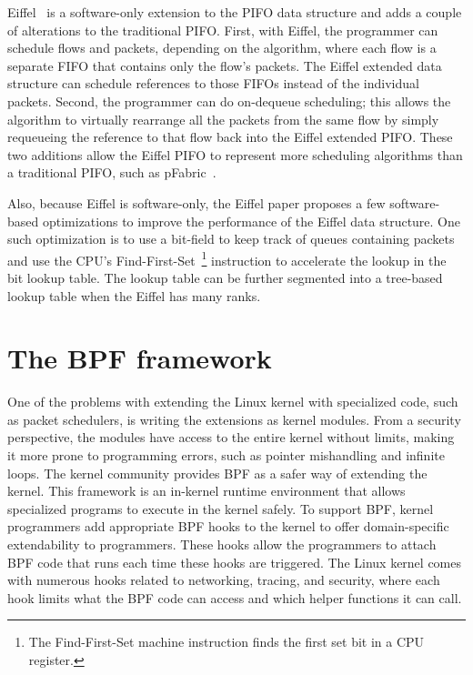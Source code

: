 \documentclass[sigconf, nonacm]{acmart}
\begin{document}
Eiffel~\cite{Saeed2019} is a software-only extension to the PIFO data structure and adds a couple of alterations to the traditional PIFO. First, with Eiffel, the programmer can schedule flows and packets, depending on the algorithm, where each flow is a separate FIFO that contains only the flow's packets. The Eiffel extended data structure can schedule references to those FIFOs instead of the individual packets. Second, the programmer can do on-dequeue scheduling; this allows the algorithm to virtually rearrange all the packets from the same flow by simply requeueing the reference to that flow back into the Eiffel extended PIFO. These two additions allow the Eiffel PIFO to represent more scheduling algorithms than a traditional PIFO, such as pFabric~\cite{alizadeh2013pfabric}.

Also, because Eiffel is software-only, the Eiffel paper proposes a few software-based optimizations to improve the performance of the Eiffel data structure. One such optimization is to use a bit-field to keep track of queues containing packets and use the CPU's Find-First-Set~\footnote{The Find-First-Set machine instruction finds the first set bit in a CPU register.} instruction to accelerate the lookup in the bit lookup table. The lookup table can be further segmented into a tree-based lookup table when the Eiffel has many ranks.


\section{The BPF framework}

One of the problems with extending the Linux kernel with specialized code, such as packet schedulers, is writing the extensions as kernel modules. From a security perspective, the modules have access to the entire kernel without limits, making it more prone to programming errors, such as pointer mishandling and infinite loops. The kernel community provides BPF as a safer way of extending the kernel. This framework is an in-kernel runtime environment that allows specialized programs to execute in the kernel safely. To support BPF, kernel programmers add appropriate BPF hooks to the kernel to offer domain-specific extendability to programmers. These hooks allow the programmers to attach BPF code that runs each time these hooks are triggered. The Linux kernel comes with numerous hooks related to networking, tracing, and security, where each hook limits what the BPF code can access and which helper functions it can call.
\end{document}
